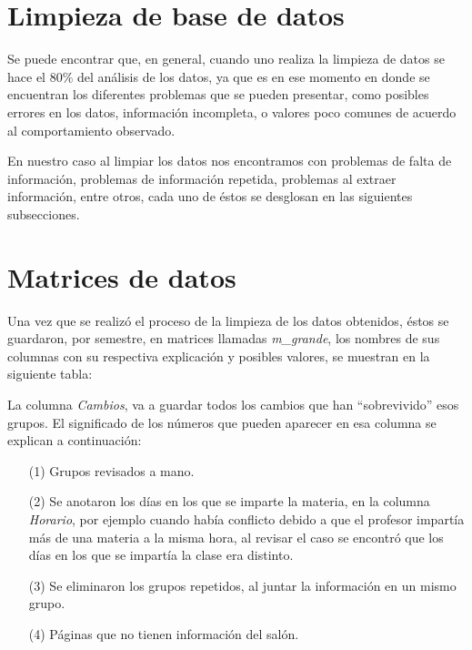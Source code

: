 \section{Limpieza de base de datos}

Se puede encontrar que, en general, cuando uno realiza la limpieza de datos se hace el 80\% del análisis de los datos, ya que es en ese momento en donde se encuentran los diferentes problemas que se pueden presentar, como posibles errores en los datos, información incompleta, o valores poco comunes de acuerdo al comportamiento observado.

En nuestro caso al limpiar los datos nos encontramos con problemas de falta de información, problemas de información repetida, problemas al extraer información, entre otros, cada uno de éstos se desglosan en las siguientes subsecciones.


\section{Matrices de datos}

Una vez que se realizó el proceso de la limpieza de los datos obtenidos, éstos se guardaron, por semestre, en matrices llamadas \textit{m\_grande}, los nombres de sus columnas con su respectiva explicación y posibles valores, se muestran en la siguiente tabla:

\dfNmatrizGrande %

La columna \textit{Cambios}, va a guardar todos los cambios que han ``sobrevivido'' esos grupos. El significado de los números que pueden aparecer en esa columna se explican a continuación:

\begin{enumerate}
\item[(1)] Grupos revisados a mano.

\item[(2)] Se anotaron los días en los que se imparte la materia, en la columna \textit{Horario}, por ejemplo cuando había conflicto debido a que el profesor impartía más de una materia a la misma hora, al revisar el caso se encontró que los días en los que se impartía la clase era distinto.

\item[(3)] Se eliminaron los grupos repetidos, al juntar la información en un mismo grupo.

\item[(4)] Páginas que no tienen información del salón.
\end{enumerate}
